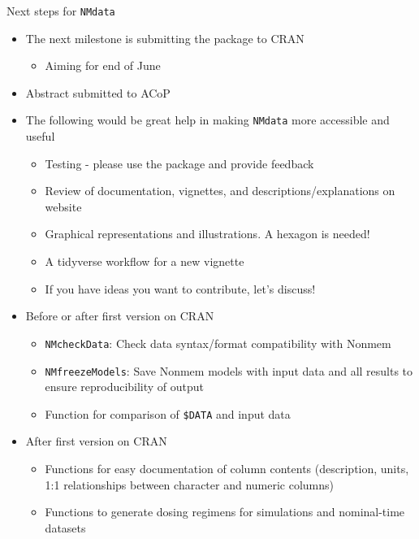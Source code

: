\documentclass[
  8pt,
  ignorenonframetext,
  aspectratio=169]{beamer}
\providecommand{\tightlist}{%
  \setlength{\itemsep}{0pt}\setlength{\parskip}{0pt}}
\begin{document}
\begin{frame}[fragile]{Next steps for \texttt{NMdata}}
\protect\hypertarget{next-steps-for-nmdata-1}{}
\begin{itemize}
\tightlist
\item
  The next milestone is submitting the package to CRAN

  \begin{itemize}
  \tightlist
  \item
    Aiming for end of June
  \end{itemize}
\item
  Abstract submitted to ACoP
\item
  The following would be great help in making \texttt{NMdata} more
  accessible and useful

  \begin{itemize}
  \tightlist
  \item
    Testing - please use the package and provide feedback
  \item
    Review of documentation, vignettes, and descriptions/explanations on
    website
  \item
    Graphical representations and illustrations. A hexagon is needed!
  \item
    A tidyverse workflow for a new vignette
  \item
    If you have ideas you want to contribute, let's discuss!
  \end{itemize}
\item
  Before or after first version on CRAN

  \begin{itemize}
  \tightlist
  \item
    \texttt{NMcheckData}: Check data syntax/format compatibility with
    Nonmem
  \item
    \texttt{NMfreezeModels}: Save Nonmem models with input data and all
    results to ensure reproducibility of output
  \item
    Function for comparison of \texttt{\$DATA} and input data
  \end{itemize}
\item
  After first version on CRAN

  \begin{itemize}
  \tightlist
  \item
    Functions for easy documentation of column contents (description,
    units, 1:1 relationships between character and numeric columns)
  \item
    Functions to generate dosing regimens for simulations and
    nominal-time datasets
  \end{itemize}
\end{itemize}
\end{frame}
\end{document}
